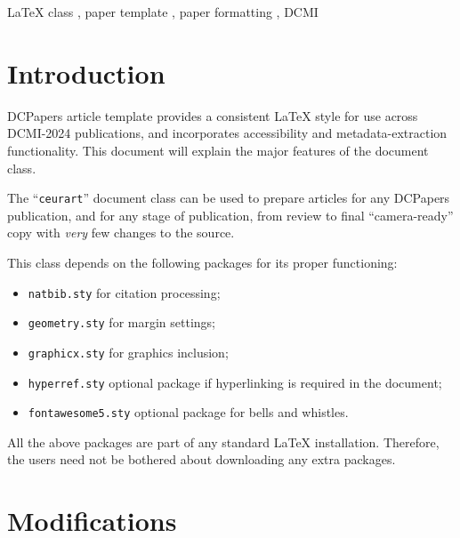 \documentclass[
]{ceurart}
\begin{document}
\begin{keywords}
  LaTeX class \sep
  paper template \sep
  paper formatting \sep
  DCMI
\end{keywords}

\maketitle

\section{Introduction}

DCPapers article template provides a consistent \LaTeX{} style for
use across DCMI-2024 publications, and incorporates accessibility and
metadata-extraction functionality. This document will explain the
major features of the document class.

The ``\verb|ceurart|'' document class can be used to prepare articles
for any DCPapers publication, and for any stage of publication, from
review to final ``camera-ready'' copy with {\itshape very} few changes
to the source.

This class depends on the following packages
for its proper functioning:

\begin{itemize}
\item \verb|natbib.sty| for citation processing;
\item \verb|geometry.sty| for margin settings;
\item \verb|graphicx.sty| for graphics inclusion;
\item \verb|hyperref.sty| optional package if hyperlinking is required in
  the document;
\item \verb|fontawesome5.sty| optional package for bells and whistles.
\end{itemize}

All the above packages are part of any
standard \LaTeX{} installation.
Therefore, the users need not be
bothered about downloading any extra packages.

\section{Modifications}
\end{document}
